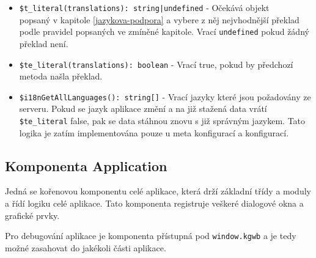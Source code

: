 \begin{itemize}
  \item \texttt{\$t_literal(translations): string|undefined} - Očekává objekt \\popsaný v kapitole \ref{jazykova-podpora} a vybere z něj nejvhodnější překlad podle pravidel popsaných ve zmíněné kapitole. Vrací \texttt{undefined} pokud žádný překlad není.

  \item \texttt{\$te_literal(translations): boolean} - Vrací true, pokud by předchozí metoda našla překlad.

  \item \texttt{\$i18nGetAllLanguages(): string[]} - Vrací jazyky které jsou požadovány ze serveru. Pokud se jazyk aplikace změní a na již stažená data vrátí \texttt{\$te_literal} false, pak se data stáhnou znovu s již správným jazykem. Tato logika je zatím implementována pouze u meta konfigurací a konfigurací.
\end{itemize}

\subsection{Komponenta Application}
Jedná se kořenovou komponentu celé aplikace, která drží základní třídy a moduly a řídí logiku celé aplikace. Tato komponenta registruje veškeré dialogové okna a grafické prvky.

Pro debugování aplikace je komponenta přístupná pod \texttt{window.kgwb} a je tedy možné zasahovat do jakékoli části aplikace.


